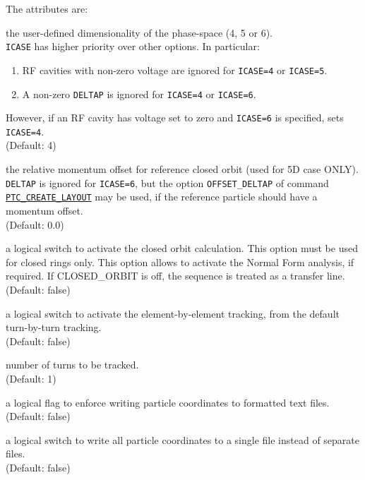 The attributes are: 
\begin{madlist}
  
   the user-defined dimensionality of the phase-space 
  (4, 5 or 6). \\ 
  {\tt ICASE} has higher priority over other options. In particular:
  \begin{enumerate}
    \item RF cavities with non-zero voltage are ignored for
      {\tt ICASE=4} or {\tt ICASE=5}.
    \item A non-zero {\tt DELTAP} is ignored for {\tt ICASE=4} or {\tt ICASE=6}.
  \end{enumerate}
  However, if an RF cavity has voltage set to zero and {\tt ICASE=6} is
  specified, \ptc sets {\tt ICASE=4}.
  \\(Default: 4)

    the relative momentum offset for reference closed
   orbit (used for 5D case ONLY). \\
   {\tt DELTAP} is ignored for {\tt ICASE=6}, but the option 
   {\tt OFFSET\_DELTAP} of command \hyperref[sec:ptc_create_layout]
   {\tt PTC\_CREATE\_LAYOUT} may be used, if the reference particle should
   have a momentum offset. \\ 
   (Default: 0.0) 

   \label{opt:closed_orbit}
   a logical switch to activate the closed orbit calculation.
   This option must be used for closed rings only. This
   option allows to activate the Normal Form analysis, if
   required. If CLOSED\_ORBIT is off, the sequence is treated as a
   transfer line. \\ (Default: false)
     
   \label{opt:element_by_element}
   a logical switch to activate the element-by-element tracking, from
   the default turn-by-turn tracking. \\ (Default: false)

    number of turns to be tracked. \\ (Default: 1)

    a logical flag to enforce writing particle coordinates
   to formatted text files. \\
   (Default: false)

    a logical switch to write all particle coordinates
   to a single file instead of separate files. \\
   (Default: false)


\end{madlist}
